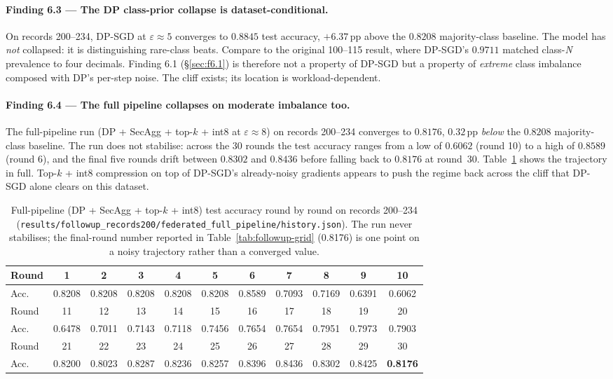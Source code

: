 \documentclass[11pt,a4paper]{report}
\begin{document}
\paragraph{Finding 6.3 --- The DP class-prior collapse is
dataset-conditional.}
On records 200--234, DP-SGD at $\varepsilon \approx 5$ converges to
$0.8845$ test accuracy, $+6.37$\,pp above the $0.8208$ majority-class
baseline. The model has \emph{not} collapsed: it is distinguishing
rare-class beats. Compare to the original 100--115 result, where
DP-SGD's $0.9711$ matched class-\emph{N} prevalence to four decimals.
Finding 6.1 (\S\ref{sec:f6.1}) is therefore not a property of DP-SGD
but a property of \emph{extreme} class imbalance composed with DP's
per-step noise. The cliff exists; its location is workload-dependent.

\paragraph{Finding 6.4 --- The full pipeline collapses on moderate
imbalance too.}
The full-pipeline run (DP + SecAgg + top-$k$ + int8 at $\varepsilon
\approx 8$) on records 200--234 converges to $0.8176$, $0.32$\,pp
\emph{below} the $0.8208$ majority-class baseline. The run does not
stabilise: across the 30 rounds the test accuracy ranges from a low
of $0.6062$ (round 10) to a high of $0.8589$ (round 6), and the final
five rounds drift between $0.8302$ and $0.8436$ before falling back to
$0.8176$ at round~30. Table~\ref{tab:fullpipe-200-convergence} shows
the trajectory in full. Top-$k$ + int8 compression on top of DP-SGD's
already-noisy gradients appears to push the regime back across the
cliff that DP-SGD alone clears on this dataset.

\begin{table}[h]
  \centering
  \caption{Full-pipeline (DP + SecAgg + top-$k$ + int8) test accuracy
  round by round on records 200--234
  (\texttt{results/followup\_records200/federated\_full\_pipeline/history.json}).
  The run never stabilises; the final-round number reported in
  Table~\ref{tab:followup-grid} (0.8176) is one point on a noisy
  trajectory rather than a converged value.}
  \label{tab:fullpipe-200-convergence}
  \begin{tabular}{lcccccccccc}
    \toprule
    Round & 1 & 2 & 3 & 4 & 5 & 6 & 7 & 8 & 9 & 10 \\
    \midrule
    Acc.\ & 0.8208 & 0.8208 & 0.8208 & 0.8208 & 0.8208 & 0.8589 & 0.7093 & 0.7169 & 0.6391 & 0.6062 \\
    \midrule
    Round & 11 & 12 & 13 & 14 & 15 & 16 & 17 & 18 & 19 & 20 \\
    \midrule
    Acc.\ & 0.6478 & 0.7011 & 0.7143 & 0.7118 & 0.7456 & 0.7654 & 0.7654 & 0.7951 & 0.7973 & 0.7903 \\
    \midrule
    Round & 21 & 22 & 23 & 24 & 25 & 26 & 27 & 28 & 29 & 30 \\
    \midrule
    Acc.\ & 0.8200 & 0.8023 & 0.8287 & 0.8236 & 0.8257 & 0.8396 & 0.8436 & 0.8302 & 0.8425 & \textbf{0.8176} \\
    \bottomrule
  \end{tabular}
\end{table}
\end{document}
